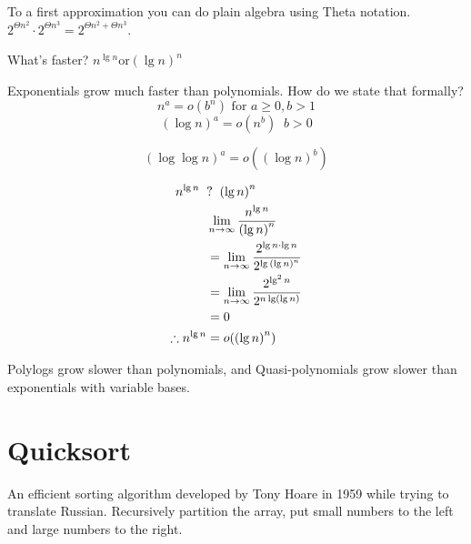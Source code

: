 \documentclass[english, 10pt]{article}
\begin{document}
To a first approximation you can do plain algebra using Theta notation.  $2^{\Theta n^2}\cdot 2^{\Theta n^3}= 2^{\Theta n^2 + \Theta n^3}$.

What's faster? $n^{\lg n} \text{or} {(\lg n)}^n$

Exponentials grow much faster than polynomials. How do we state that formally?
$$n^a = o(b^n) \text{ for } a\ge 0, b>1$$
$${(\log n)}^a = o(n^b) \;\; b>0$$

$${(\log\log n)}^a = o({(\log n)}^b) $$

\begin{align*}
    n^{\lg n } \;\;&?\;\; {(\lg n)}^n \\
    &  \lim_{n\rightarrow\infty} \frac{n^{\lg n }}{{(\lg n)}^n} \\
    &= \lim_{n\rightarrow\infty} \frac{2^{\lg n\cdot \lg n }}{2^{\lg{(\lg n)}^n}} \\
    &= \lim_{n\rightarrow\infty} \frac{2^{\lg^2 n }}{2^{n\lg(\lg n)}} \\
    &= 0 \\
    \therefore n^{\lg n } &= o({(\lg n)}^n) \\
\end{align*}

Polylogs grow slower than polynomials, and Quasi-polynomials grow slower than exponentials with variable bases.


\section{Quicksort}

An efficient sorting algorithm developed by Tony Hoare in 1959 while trying to translate Russian.
Recursively partition the array, put small numbers to the left and large numbers to the right.

\begin{algorithm}
    \DontPrintSemicolon%
\end{algorithm}
\end{document}
